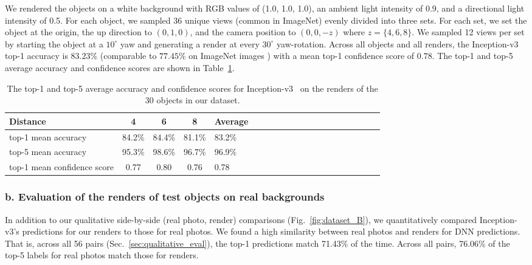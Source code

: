 \documentclass[10pt,twocolumn,letterpaper]{article}
\begin{document}
We rendered the objects on a white background with RGB values of (1.0, 1.0, 1.0), an ambient light intensity of 0.9, and a directional light intensity of 0.5.
For each object, we sampled 36 unique views (common in ImageNet) evenly divided into three sets.
For each set, we set the object at the origin, the up direction to $(0,1,0)$, and the camera position to $(0,0,-z)$ where $z = \{4, 6, 8\}$.
We sampled 12 views per set by starting the object at a $10^\circ{}$ yaw and generating a render at every $30^\circ{}$ yaw-rotation.
Across all objects and all renders, the Inception-v3 top-1 accuracy is $83.23\%$ (comparable to $77.45\%$ on ImageNet images \cite{szegedy2016rethinking}) with a mean top-1 confidence score of $0.78$.
The top-1 and top-5 average accuracy and confidence scores are shown in
Table~\ref{tab:avg_accuracy_30obj}.

\begin{table}[h]
	\centering
	\begin{tabular}{*{5}{lccc}}
		\toprule
		Distance &  4 & 6 & 8 & Average \\ \midrule
		top-1 mean accuracy & 84.2\% & 84.4\%& 81.1\%& 83.2\%\\
		top-5 mean accuracy & 95.3\% & 98.6\%& 96.7\%& 96.9\% \\
		top-1 mean confidence score & 0.77 & 0.80 & 0.76& 0.78 \\ \bottomrule
	\end{tabular}
	\caption{The top-1 and top-5 average accuracy and confidence scores for Inception-v3~\cite{szegedy2016rethinking} on the renders of the 30 objects in our dataset.}\label{tab:avg_accuracy_30obj}
\end{table}

\subsubsection*{b. Evaluation of the renders of test objects on real backgrounds}

In addition to our qualitative side-by-side (real photo, render) comparisons (Fig.~\ref{fig:dataset_B}), we quantitatively compared Inception-v3's predictions for our renders to those for real photos.
We found a high similarity between real photos and renders for DNN predictions.
That is, across all 56 pairs (Sec.~\ref{sec:qualitative_eval}), the top-1 predictions match 71.43\% of the time.
Across all pairs, 76.06\% of the top-5 labels for real photos match those for renders.
\end{document}
